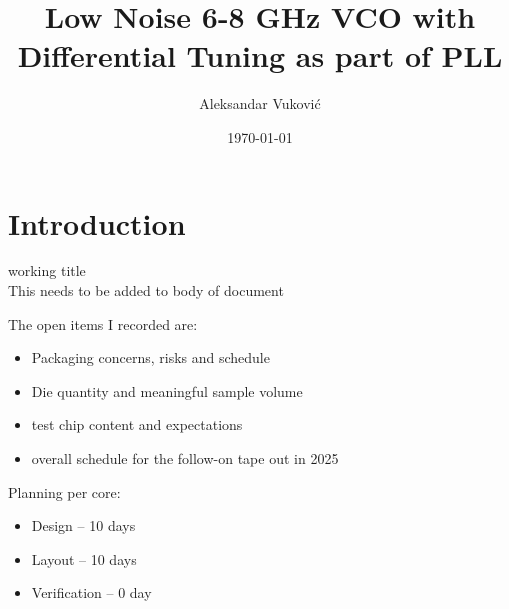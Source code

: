\documentclass{article}
\title{Low Noise 6-8 GHz VCO with Differential Tuning as part of PLL} %
\author{Aleksandar Vuković} %
\date{\today} %
\begin{document}
\maketitle %


\section*{Introduction}

working title %
\\
This needs to be added to body of document %

The open items I recorded are:
\begin{itemize}
	\item Packaging concerns, risks and schedule
	\item Die quantity and meaningful sample volume
	\item test chip content and expectations
	\item overall schedule for the follow-on tape out in 2025
\end{itemize}

Planning per core:

\begin{itemize}
	\item Design -- 10 days
	\item Layout -- 10 days
	\item Verification -- 0 day
\end{itemize}





\end{document}
